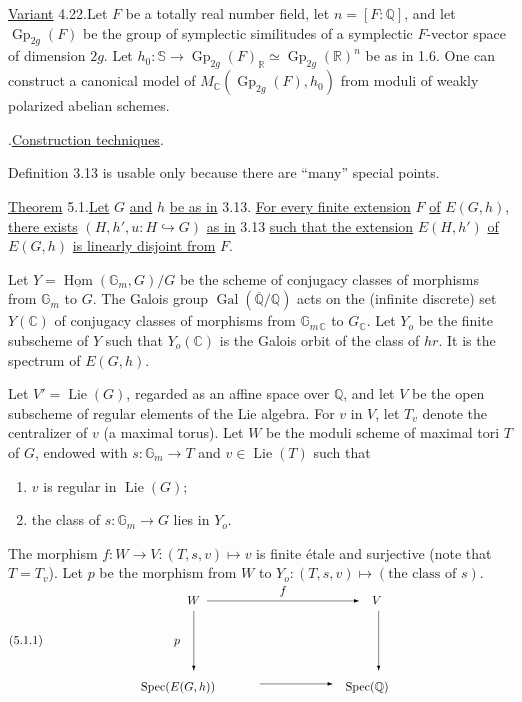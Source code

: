 \documentclass[10pt]{article}
\newcommand{\C}{\mathbb C}
\newcommand{\Gm}{\mathbb G_m}
\newcommand{\Q}{\mathbb Q}
\newcommand{\R}{\mathbb R}
\newcommand{\bS}{\mathbb S}
\newcommand{\Gp}{\operatorname{Gp}}
\newcommand{\Hom}{\operatorname{Hom}}
\newcommand{\Lie}{\operatorname{Lie}}
\newcommand{\Gal}{\operatorname{Gal}}
\newcommand{\Spec}{\operatorname{Spec}}
\begin{document}
\noindent \uline{Variant} 4.22.\quad Let $F$ be a totally real number field, let $n=[F:\Q]$, and let $\Gp_{2g}(F)$ be the group of symplectic similitudes of a symplectic $F$-vector space of dimension $2g$. Let $h_0:\bS\longrightarrow \Gp_{2g}(F)_\R\simeq \Gp_{2g}(\R)^n$ be as in 1.6. One can construct a canonical model of $M_{\C}(\Gp_{2g}(F),h_0)$ from moduli of weakly polarized abelian schemes.

\par\vspace{1.1em}
.\quad \uline{Construction techniques}.\par\vspace{0.9em}

Definition 3.13 is usable only because there are ``many'' special points.

\noindent \uline{Theorem} 5.1.\quad \uline{Let} $G$ \uline{and} $h$ \uline{be as in} 3.13. \uline{For every finite extension} $F$ \uline{of} $E(G,h)$, \uline{there exists} $(H,h',u:H\hookrightarrow G)$ \uline{as in} 3.13 \uline{such that the extension} $E(H,h')$ \uline{of} $E(G,h)$ \uline{is linearly disjoint from} $F$.

Let $Y=\underline{\Hom}(\Gm,G)/G$ be the scheme of conjugacy classes of morphisms from $\Gm$ to $G$. The Galois group $\Gal(\overline{\Q}/\Q)$ acts on the (infinite discrete) set $Y(\C)$ of conjugacy classes of morphisms from $\Gm{}_{\C}$ to $G_{\C}$. Let $Y_o$ be the finite subscheme of $Y$ such that $Y_o(\C)$ is the Galois orbit of the class of $hr$. It is the spectrum of $E(G,h)$.

Let $V'=\Lie(G)$, regarded as an affine space over $\Q$, and let $V$ be the open subscheme of regular elements of the Lie algebra. For $v$ in $V$, let $T_v$ denote the centralizer of $v$ (a maximal torus). Let $W$ be the moduli scheme of maximal tori $T$ of $G$, endowed with $s:\Gm\longrightarrow T$ and $v\in\Lie(T)$ such that
\begin{enumerate}[label=(\alph*)]
\item $v$ is regular in $\Lie(G)$;
\item the class of $s:\Gm\to G$ lies in $Y_o$.
\end{enumerate}
The morphism $f:W\longrightarrow V:(T,s,v)\longmapsto v$ is finite étale and surjective (note that $T=T_v$). Let $p$ be the morphism from $W$ to $Y_o:(T,s,v)\longmapsto(\text{the class of }s)$.
\[
\begingroup
\setlength{\unitlength}{0.55em}
\begin{picture}(76,15)
\put(0,7){\((5.1.1)\)}
\put(27,13){\(W\)}
\put(55,13){\(V\)}
\put(20,0){\(\Spec(E(G,h))\)}
\put(51,0){\(\Spec(\Q)\)}
\put(30,13.5){\vector(1,0){23}}
\put(41,14.5){\(f\)}
\put(28,12){\vector(0,-1){9}}
\put(25,7){\(p\)}
\put(56,12){\vector(0,-1){9}}
\put(38,1){\vector(1,0){11}}
\end{picture}
\endgroup
\]
\end{document}

